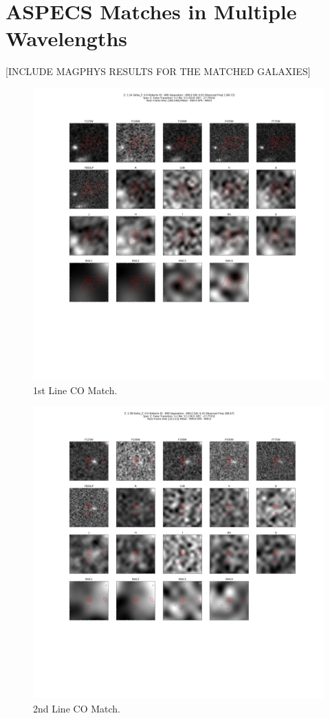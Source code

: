 \section{ASPECS Matches in Multiple Wavelengths}

[INCLUDE MAGPHYS RESULTS FOR THE MATCHED GALAXIES]

\begin{figure}[tbp]
\centering \includegraphics[width=120mm]{Matched/ASPECS_Cutout_0.png}
\caption{1st Line CO Match.}
\label{fig:Match_One}
\end{figure}

\begin{figure}[tbp]
\centering \includegraphics[width=120mm]{Matched/ASPECS_Cutout_1.png}
\caption{2nd Line CO Match.}
\label{fig:Match_Two}
\end{figure}

